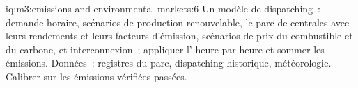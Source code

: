 \begin{solution}{iq:m3:emissions-and-environmental-markets:6}
Un modèle de dispatching~: demande horaire, scénarios de production renouvelable, le parc de centrales avec leurs rendements et leurs facteurs
d'émission, scénarios de prix du combustible et du carbone, et interconnexion~; appliquer l' heure par heure et sommer
les émissions. Données~: registres du parc, dispatching historique, météorologie. Calibrer sur les émissions vérifiées passées.
\end{solution}

